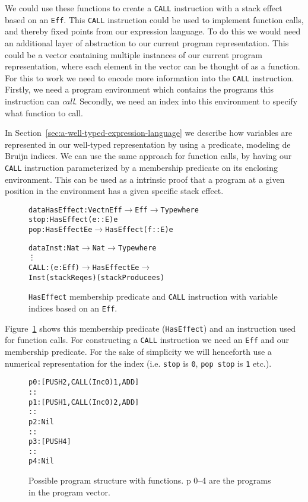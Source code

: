 We could use these functions to create a \texttt{CALL} instruction with a stack effect based on an \texttt{Eff}. This \texttt{CALL} instruction could be used to implement function calls, and thereby fixed points from our expression language. To do this we would need an additional layer of abstraction to our current program representation. This could be a vector containing multiple instances of our current program representation, where each element in the vector can be thought of as a function. For this to work we need to encode more information into the \texttt{CALL} instruction. Firstly, we need a program environment which contains the programs this instruction can \emph{call}. Secondly, we need an index into this environment to specify what function to call.

In Section~\ref{sec:a-well-typed-expression-language} we describe how variables are represented in our well-typed representation by using a predicate, modeling de Bruijn indices. We can use the same approach for function calls, by having our \texttt{CALL} instruction parameterized by a membership predicate on its enclosing environment. This can be used as a intrinsic proof that a program at a given position in the environment has a given specific stack effect. 

\begin{figure}
\begin{alltt}
data HasEffect : Vect n Eff \(\to\) Eff \(\to\) Type where
    stop : HasEffect (e :: E) e
    pop  : HasEffect E e \(\to\) HasEffect (f :: E) e

data Inst : Nat \(\to\) Nat \(\to\) Type where
    \vdots    
    CALL : (e : Eff) \(\to\) HasEffect E e \(\to\) 
           Inst (stackReq e s) (stackProduce e s)
\end{alltt}
\caption{\texttt{HasEffect} membership predicate and \texttt{CALL} instruction with variable indices based on an \texttt{Eff}.}
\label{fig:call}
\end{figure}

Figure~\ref{fig:call} shows this membership predicate (\texttt{HasEffect}) and an instruction used for function calls. For constructing a \texttt{CALL} instruction we need an \texttt{Eff} and our membership predicate. For the sake of simplicity we will henceforth use a numerical representation for the index (i.e. \texttt{stop} is \texttt{0}, \texttt{pop stop} is \texttt{1} etc.).

\begin{figure}
\begin{alltt}
p 0: [PUSH 2, CALL (Inc 0) 1, ADD]
     ::
p 1: [PUSH 1, CALL (Inc 0) 2, ADD]
     ::
p 2: Nil
     ::
p 3: [PUSH 4]
     ::
p 4: Nil
\end{alltt}
\caption{Possible program structure with functions. p 0--4 are the programs in the program vector.}
\label{fig:program_structure}
\end{figure}

